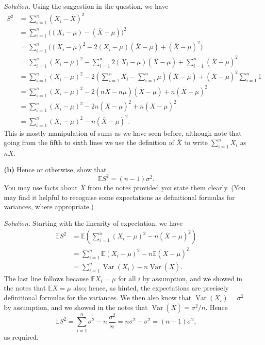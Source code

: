 \documentclass[
  a4paper,
]{book}
\theoremstyle{definition}
\theoremstyle{definition}
\theoremstyle{definition}
\theoremstyle{definition}
\theoremstyle{remark}
\begin{document}
\begin{myanswers}
\emph{Solution.}
Using the suggestion in the question, we have
\begin{align*}
S^2 &= \sum_{i=1}^n (X_i - \overline X)^2 \\
  &= \sum_{i=1}^n \big( (X_i - \mu) - (\overline X - \mu)  \big)^2 \\
  &= \sum_{i=1}^n \big( (X_i - \mu)^2 - 2(X_i - \mu)(\overline X - \mu) + (\overline X - \mu)^2\big) \\
  &= \sum_{i=1}^n (X_i - \mu)^2 - \sum_{i=1}^n 2(X_i - \mu)(\overline X - \mu) + \sum_{i=1}^n (\overline X - \mu)^2 \\
  &= \sum_{i=1}^n (X_i - \mu)^2 - 2\left(\sum_{i=1}^n X_i - \sum_{i=1}^n \mu\right)(\overline X - \mu)  + (\overline X - \mu)^2 \sum_{i=1}^n 1 \\
  &= \sum_{i=1}^n (X_i - \mu)^2 - 2(n\overline X - n\mu) (\overline X - \mu) + n (\overline X - \mu)^2 \\
  &= \sum_{i=1}^n (X_i - \mu)^2 - 2n(\overline X - \mu)^2 + n(\overline X - \mu)^2 \\
  &= \sum_{i=1}^n (X_i - \mu)^2 - n(\overline X - \mu)^2 .
\end{align*}
This is mostly manipulation of sums as we have seen before, although note that going from the fifth to sixth lines we use the definition of \(\overline X\) to write \(\sum_{i=1}^n X_i\) as \(n \overline X\).

\end{myanswers}

\textbf{(b)} Hence or otherwise, show that
\[ \mathbb E S^2 = (n - 1)\sigma^2 . \]
You may use facts about \(\overline X\) from the notes provided you state them clearly. (You may find it helpful to recognise some expectations as definitional formulas for variances, where appropriate.)

\begin{myanswers}
\emph{Solution.} Starting with the linearity of expectation, we have
\begin{align*}
\mathbb ES^2 &= \mathbb E \left( \sum_{i=1}^n (X_i - \mu)^2 - n(\overline X - \mu)^2  \right) \\
  &= \sum_{i=1}^n \mathbb E (X_i - \mu)^2 - n \mathbb E(\overline X - \mu)^2 \\
  &= \sum_{i=1}^n \operatorname{Var}(X_i) - n \operatorname{Var}(\overline X) .
\end{align*}
The last line follows because \(\mathbb EX_i = \mu\) for all \(i\) by assumption, and we showed in the notes that \(\mathbb E \overline X = \mu\) also; hence, as hinted, the expectations are precisely definitional formulas for the variances. We then also know that \(\operatorname{Var}(X_i) = \sigma^2\) by assumption, and we showed in the notes that \(\operatorname{Var}(\overline X) = \sigma^2/n\). Hence
\[ \mathbb ES^2 = \sum_{i=1}^n \sigma^2 - n\, \frac{\sigma^2}{n} = n \sigma^2 - \sigma^2 = (n-1)\sigma^2, \]
as required.

\end{myanswers}
\end{document}
